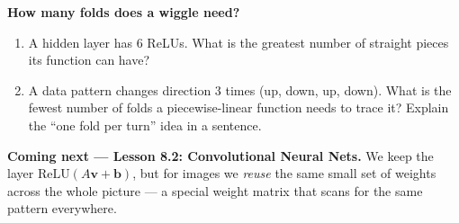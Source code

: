 \documentclass[10pt]{article}
\newcommand{\vv}{\mathbf{v}}
\newcommand{\bb}{\mathbf{b}}
\newcommand{\relu}{\mathrm{ReLU}}
\begin{document}
\begin{extensionbox}
\textbf{How many folds does a wiggle need?}
\begin{enumerate}[label=(\alph*), leftmargin=1.8em, itemsep=5pt]
  \item A hidden layer has $6$ ReLUs. What is the greatest number of straight pieces its function can have?
  \item A data pattern changes direction $3$ times (up, down, up, down). What is the fewest number of folds
        a piecewise-linear function needs to trace it? Explain the ``one fold per turn'' idea in a sentence.
\end{enumerate}
\end{extensionbox}

\begin{spiralbox}
\textbf{Coming next --- Lesson 8.2: Convolutional Neural Nets.} We keep the layer $\relu(A\vv+\bb)$, but for
images we \emph{reuse} the same small set of weights across the whole picture --- a special weight matrix
that scans for the same pattern everywhere.
\end{spiralbox}
\end{document}

